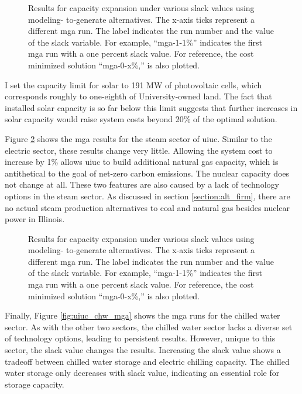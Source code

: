 \begin{figure}[H]
  \centering
  \resizebox{0.95\columnwidth}{!}{}
  \caption{Results for capacity expansion under various slack values using modeling-
  to-generate alternatives. The x-axis ticks represent a different \gls{mga} run.
  The label indicates the run number and the value of the slack variable. For example,
  ``mga-1-1\%'' indicates the first \gls{mga} run with a one percent
  slack value. For reference, the cost minimized solution ``mga-0-x\%,'' is also
  plotted.}
  \label{fig:uiuc_elc_mga}
\end{figure}

I set the capacity limit for solar to 191 MW of photovoltaic cells, which corresponds
roughly to one-eighth of University-owned land. The fact that installed solar capacity
is so far below this limit suggests that further increases in solar capacity would
raise system costs beyond 20\% of the optimal solution.

Figure \ref{fig:uiuc_thm_mga} shows the \gls{mga} results for the steam sector
of \gls{uiuc}. Similar to the electric sector, these results change very little.
Allowing the system cost to increase by 1\% allows \gls{uiuc} to build additional
natural gas capacity, which is antithetical to the goal of net-zero carbon emissions.
The nuclear capacity does not change at all. These two features are also caused
by a lack of technology options in the steam sector. As discussed in section
\ref{section:alt_firm}, there are no actual steam production alternatives to coal
and natural gas besides nuclear power in Illinois.


\begin{figure}[H]
  \centering
  \resizebox{0.95\columnwidth}{!}{}
  \caption{Results for capacity expansion under various slack values using modeling-
  to-generate alternatives. The x-axis ticks represent a different \gls{mga} run.
  The label indicates the run number and the value of the slack variable. For example,
  ``mga-1-1\%'' indicates the first \gls{mga} run with a one percent
  slack value. For reference, the cost minimized solution ``mga-0-x\%,'' is also
  plotted.}
  \label{fig:uiuc_thm_mga}
\end{figure}

Finally, Figure \ref{fig:uiuc_chw_mga} shows the \gls{mga} runs for the chilled
water sector. As with the other two sectors, the chilled water sector lacks a
diverse set of technology options, leading to persistent results. However,
unique to this sector, the slack value changes the results. Increasing the slack
value shows a tradeoff between chilled water storage and electric chilling capacity.
The chilled water storage only decreases with slack value, indicating an
essential role for storage capacity.

